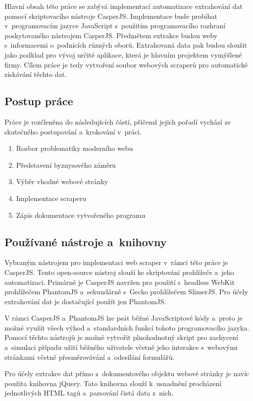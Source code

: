 \documentclass[11pt,a4paper]{article}
\begin{document}
Hlavní obsah této práce se zabývá implementací automatizace extrahování dat pomocí skriptovacího nástroje CasperJS\cite{casperjs}. Implementace bude probíhat v~programovacím jazyce JavaScript s~použitím programovacího rozhraní poskytovaného nástrojem CasperJS. Předmětem extrakce budou weby s~informacemi o~podnicích různých oborů. Extrahovaná data pak budou sloužit jako podklad pro vývoj určité aplikace, která je hlavním projektem vymýšlené firmy. Cílem práce je tedy vytvoření soubor webových scraperů pro automatické získávání těchto dat.

\subsection{Postup práce}
Práce je rozčleněna do následujících částí, přičemž jejich pořadí vychází ze skutečného postupování a~krokování v~práci.
\begin{enumerate}
\item Rozbor problematiky moderního webu
\item Představení byznysového záměru
\item Výběr vhodné webové stránky
\item Implementace scraperu
\item Zápis dokumentace vytvořeného programu
\end{enumerate}

\subsection{Používané nástroje a~knihovny}
Vybraným nástrojem pro implementaci web scraper v~rámci této práce je CasperJS. Tento open-source nástroj slouží ke skriptování prohlížeče a~jeho automatizaci. Primárně je CasperJS navržen pro použití s~headless WebKit prohlížečem PhantomJS a~sekundárně s~Gecko prohlížečem SlimerJS. Pro účely extrahování dat je dostačující použít jen PhantomJS. 

V rámci CasperJS a~PhantomJS lze psát běžné JavaScriptové kódy a~proto je možné využít všech výhod a~standardních funkcí tohoto programovacího jazyka. Pomocí těchto nástrojů je možné vytvořit plnohodnotný skript pro zachycení a~simulaci případu užití běžného uživatele včetně jeho interakce s~webovými stránkami včetně přesměrovávání a~odesílání formulářů.

Pro účely extrakce dat přímo z~dokumentového objektu webové stránky je navíc použita knihovna jQuery. Tato knihovna slouží k~usnadnění procházení jednotlivých HTML tagů a~parsování čistá data z~nich.
\end{document}
